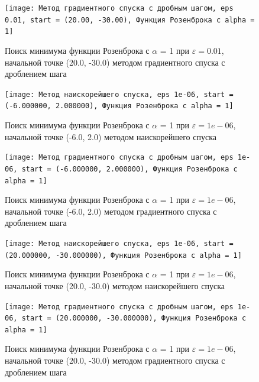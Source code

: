             \begin{figure}[H]
	        \centering
	        \texttt{[image: Метод градиентного спуска с дробным шагом, eps 0.01, start = (20.00, -30.00), Функция Розенброка с alpha = 1]}%
	        \caption{Поиск минимума функции Розенброка с $\alpha$ = 1 при $\varepsilon = 0.01$, начальной точке (20.0, -30.0) методом градиентного спуска с дроблением шага}
	        \vspace*{-1.2cm}
            \end{figure}
            
            \begin{figure}[H]
	        \centering
	        \texttt{[image: Метод наискорейшего спуска, eps 1e-06, start = (-6.000000, 2.000000), Функция Розенброка с alpha = 1]}%
	        \caption{Поиск минимума функции Розенброка с $\alpha$ = 1 при $\varepsilon = 1e-06$, начальной точке (-6.0, 2.0) методом наискорейшего спуска}
	        \vspace*{-1.2cm}
            \end{figure}
            
            \begin{figure}[H]
	        \centering
	        \texttt{[image: Метод градиентного спуска с дробным шагом, eps 1e-06, start = (-6.000000, 2.000000), Функция Розенброка с alpha = 1]}%
	        \caption{Поиск минимума функции Розенброка с $\alpha$ = 1 при $\varepsilon = 1e-06$, начальной точке (-6.0, 2.0) методом градиентного спуска с дроблением шага}
	        \vspace*{-1.2cm}
            \end{figure}
            
            \begin{figure}[H]
	        \centering
	        \texttt{[image: Метод наискорейшего спуска, eps 1e-06, start = (20.000000, -30.000000), Функция Розенброка с alpha = 1]}%
	        \caption{Поиск минимума функции Розенброка с $\alpha$ = 1 при $\varepsilon = 1e-06$, начальной точке (20.0, -30.0) методом наискорейшего спуска}
	        \vspace*{-1.2cm}
            \end{figure}
            
            \begin{figure}[H]
	        \centering
	        \texttt{[image: Метод градиентного спуска с дробным шагом, eps 1e-06, start = (20.000000, -30.000000), Функция Розенброка с alpha = 1]}%
	        \caption{Поиск минимума функции Розенброка с $\alpha$ = 1 при $\varepsilon = 1e-06$, начальной точке (20.0, -30.0) методом градиентного спуска с дроблением шага}
	        \vspace*{-1.2cm}
            \end{figure}
